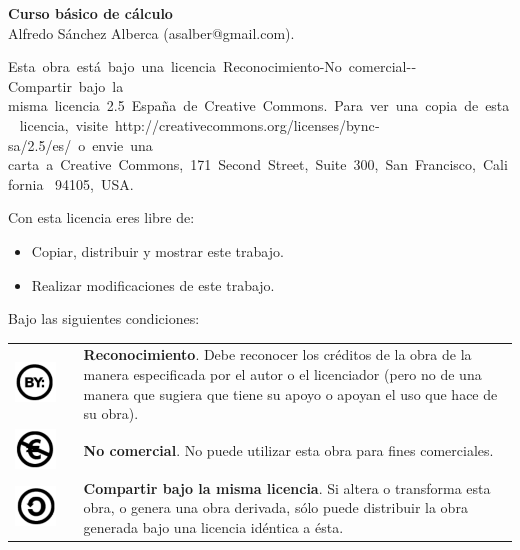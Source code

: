 \sffamily
\small
\noindent \textbf{Curso básico de cálculo}\\
Alfredo Sánchez Alberca (asalber@gmail.com).
\smallskip

\scriptsize
Esta obra está bajo una licencia Reconocimiento­-No comercial-­Compartir bajo la 
misma licencia 2.5 España de Creative Commons. Para ver una copia de esta 
licencia, visite http://creativecommons.org/licenses/by­nc­sa/2.5/es/ o envie una 
carta a Creative Commons, 171 Second Street, Suite 300, San Francisco, California 
94105, USA.

\medskip
Con esta licencia eres libre de:
\begin{itemize}
\item Copiar, distribuir y mostrar este trabajo.
\item Realizar modificaciones de este trabajo.
\end{itemize}

Bajo las siguientes condiciones:
\begin{center}
\begin{tabular}{ccp{10cm}}
\includegraphics[scale=0.2]{img/cc-by} & \qquad & \textbf{Reconocimiento}. Debe reconocer los créditos de la obra de la manera especificada por el autor o el licenciador (pero no de una manera que sugiera que tiene su apoyo o apoyan el uso que hace de su obra).\\
\includegraphics[scale=0.2]{img/cc-e} & \qquad & \textbf{No comercial}. No puede utilizar esta obra para fines comerciales.\\
\includegraphics[scale=0.2]{img/cc-c} & \qquad & \textbf{Compartir bajo la misma licencia}. Si altera o transforma esta obra, o genera una obra derivada, sólo puede distribuir la obra generada bajo una licencia idéntica a ésta.
\end{tabular}
\end{center}


